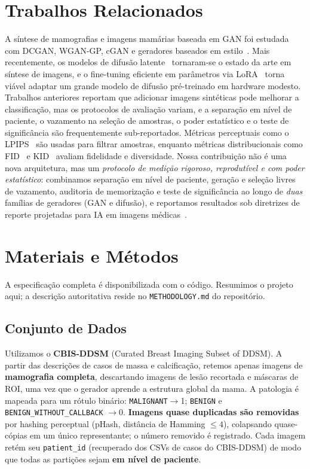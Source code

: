 \documentclass[runningheads]{llncs}
\begin{document}
\section{Trabalhos Relacionados}
A síntese de mamografias e imagens mamárias baseada em GAN foi estudada com
DCGAN, WGAN-GP, cGAN e geradores baseados em
estilo~\cite{goodfellow2014gan,karras2020ada}. Mais recentemente, os modelos de
difusão latente~\cite{rombach2022ldm} tornaram-se o estado da arte em síntese de
imagens, e o fine-tuning eficiente em parâmetros via LoRA~\cite{hu2022lora} torna
viável adaptar um grande modelo de difusão pré-treinado em hardware modesto.
Trabalhos anteriores reportam que adicionar imagens sintéticas pode melhorar a
classificação, mas os protocolos de avaliação variam, e a separação em nível de
paciente, o vazamento na seleção de amostras, o poder estatístico e o teste de
significância são frequentemente sub-reportados. Métricas perceptuais como o
LPIPS~\cite{zhang2018lpips} são usadas para filtrar amostras, enquanto métricas
distribucionais como FID~\cite{heusel2017fid} e KID~\cite{binkowski2018kid}
avaliam fidelidade e diversidade. Nossa contribuição não é uma nova arquitetura,
mas um \emph{protocolo de medição rigoroso, reprodutível e com poder
estatístico}: combinamos separação em nível de paciente, geração e seleção livres
de vazamento, auditoria de memorização e teste de significância ao longo de
\emph{duas} famílias de geradores (GAN e difusão), e reportamos resultados sob
diretrizes de reporte projetadas para IA em imagens
médicas~\cite{mongan2020claim,collins2024tripodai,moons2024probastai}.

\section{Materiais e Métodos}
A especificação completa é disponibilizada com o código. Resumimos o projeto
aqui; a descrição autoritativa reside no \texttt{METHODOLOGY.md} do repositório.

\subsection{Conjunto de Dados}
Utilizamos o \textbf{CBIS-DDSM} (Curated Breast Imaging Subset of DDSM). A partir
das descrições de casos de massa e calcificação, retemos apenas imagens de
\textbf{mamografia completa}, descartando imagens de lesão recortada e máscaras
de ROI, uma vez que o gerador aprende a estrutura global da mama. A patologia é
mapeada para um rótulo binário: \texttt{MALIGNANT}$\to$1; \texttt{BENIGN} e
\texttt{BENIGN\_WITHOUT\_CALLBACK} $\to$0. \textbf{Imagens quase duplicadas são
removidas} por hashing perceptual (pHash, distância de Hamming $\le 4$),
colapsando quase-cópias em um único representante; o número removido é
registrado. Cada imagem retém seu \texttt{patient\_id} (recuperado dos CSVs de
casos do CBIS-DDSM) de modo que todas as partições sejam \textbf{em nível de
paciente}.
\end{document}
